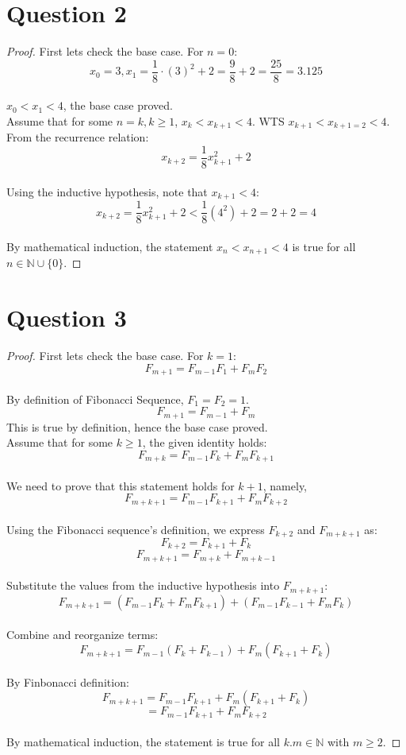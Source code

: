 \documentclass{article}
\begin{document}
\section*{Question 2}
\begin{proof}
    First lets check the base case. For $n = 0$: 
    \[ x_0 = 3, x_1 = \frac{1}{8} \cdot (3)^2 + 2 = \frac{9}{8} + 2 = \frac{25}{8} = 3.125 \]
    \\
    $x_0 < x_1 < 4$, the base case proved.
    \\
    Assume that for some $n = k, k \geq 1$, $x_k < x_{k+1} < 4$. WTS $x_{k+1} < x_{k+1=2} < 4$. 
    \\
    From the recurrence relation: \[ x_{k+2} = \frac{1}{8}x^2_{k+1} + 2 \]
    \\
    Using the inductive hypothesis, note that $x_{k+1} < 4$:
    \[ x_{k+2} = \frac{1}{8}x^2_{k+1} + 2 < \frac{1}{8}(4^2) + 2 = 2 + 2 = 4 \]
    \\
    By mathematical induction, the statement $x_{n} < x_{n + 1} < 4$ is true for all $n \in \mathbb{N} \cup \{0\}$.
\end{proof}

\section*{Question 3}
\begin{proof}
    First lets check the base case. For $k = 1$: 
    \[ F_{m + 1} = F_{m - 1}F_1 + F_m F_2 \]
    \\
    By definition of Fibonacci Sequence, $F_1 = F_2 = 1$.
    \[ F_{m + 1} = F_{m - 1} + F_m \]
    This is true by definition, hence the base case proved.
    \\
    Assume that for some $k \geq 1$, the given identity holds:
    \[ F_{m + k} = F_{m - 1}F_k + F_m F_{k + 1} \]
    \\
    We need to prove that this statement holds for $k+1$, namely,
    \[ F_{m + k + 1} = F_{m - 1}F_{k + 1} + F_m F_{k + 2} \]
    \\
    Using the Fibonacci sequence's definition, we express $F_{k+2}$ and $F_{m+k+1}$ as:
    \[ F_{k+2} = F_{k+1} + F_k \]
    \[ F_{m+k+1} = F_{m+k} + F_{m+k-1} \]
    \\
    Substitute the values from the inductive hypothesis into $F_{m+k+1}$:
    \[ F_{m+k+1} = (F_{m-1}F_k + F_mF_{k+1}) + (F_{m-1}F_{k-1} + F_mF_k) \]
    \\
    Combine and reorganize terms:
    \[  F_{m+k+1} = F_{m-1}(F_k + F_{k-1}) + F_m(F_{k+1} + F_k) \]
    \\
    By Finbonacci definition:
    \[ F_{m+k+1} = F_{m-1}F_{k+1} + F_m(F_{k+1} + F_k) \]
    \[ =  F_{m-1}F_{k+1} + F_mF_{k+2} \]
    \\
    By mathematical induction, the statement is true for all $k.m \in \mathbb{N}$ with $m \geq 2$.
\end{proof}
\end{document}

